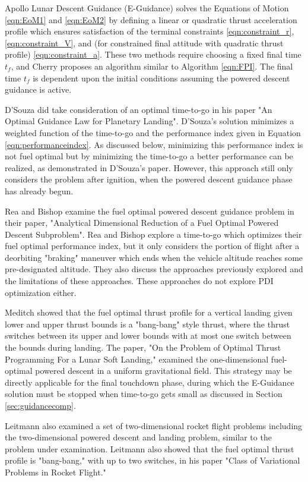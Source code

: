 Apollo Lunar Descent Guidance (E-Guidance) solves the Equations of Motion \ref{eqn:EoM1} and \ref{eqn:EoM2} by defining a linear or quadratic thrust acceleration profile which ensures satisfaction of the terminal constraints \ref{eqn:constraint_r}, \ref{eqn:constraint_V}, and (for constrained final attitude with quadratic thrust profile) \ref{eqn:constraint_a}. These two methods require choosing a fixed final time $t_f$, and Cherry proposes an algorithm similar to Algorithm \ref{eqn:FPI}. The final time $t_f$ is dependent upon the initial conditions assuming the powered descent guidance is active.

D'Souza did take consideration of an optimal time-to-go in his paper "An Optimal Guidance Law for Planetary Landing"\:\cite{DSOUZA}. D'Souza's solution minimizes a weighted function of the time-to-go and the performance index given in Equation \ref{eqn:performanceindex}. As discussed below, minimizing this performance index is not fuel optimal but by minimizing the time-to-go a better performance can be realized, as demonstrated in D'Souza's paper. However, this approach still only considers the problem after ignition, when the powered descent guidance phase has already begun.

Rea and Bishop examine the fuel optimal powered descent guidance problem in their paper, "Analytical Dimensional Reduction of a Fuel Optimal Powered Descent Subproblem"\:\cite{REA}. Rea and Bishop explore a time-to-go which optimizes their fuel optimal performance index, but it only considers the portion of flight after a deorbiting "braking" maneuver which ends when the vehicle altitude reaches some pre-designated altitude. They also discuss the approaches previously explored and the limitations of these approaches. These approaches do not explore PDI optimization either.

Meditch showed that the fuel optimal thrust profile for a vertical landing given lower and upper thrust bounds is a "bang-bang" style thrust, where the thrust switches between its upper and lower bounds with at most one switch between the bounds during landing. The paper, "On the Problem of Optimal Thrust Programming For a Lunar Soft Landing,"\:\cite{MEDITCH} examined the one-dimensional fuel-optimal powered descent in a uniform gravitational field. This strategy may be directly applicable for the final touchdown phase, during which the E-Guidance solution must be stopped when time-to-go gets small as discussed in Section \ref{sec:guidancecomp}.

Leitmann also examined a set of two-dimensional rocket flight problems including the two-dimensional powered descent and landing problem, similar to the problem under examination. Leitmann also showed that the fuel optimal thrust profile is "bang-bang," with up to two switches, in his paper "Class of Variational Problems in Rocket Flight."\:\cite{LEITMANN} 


